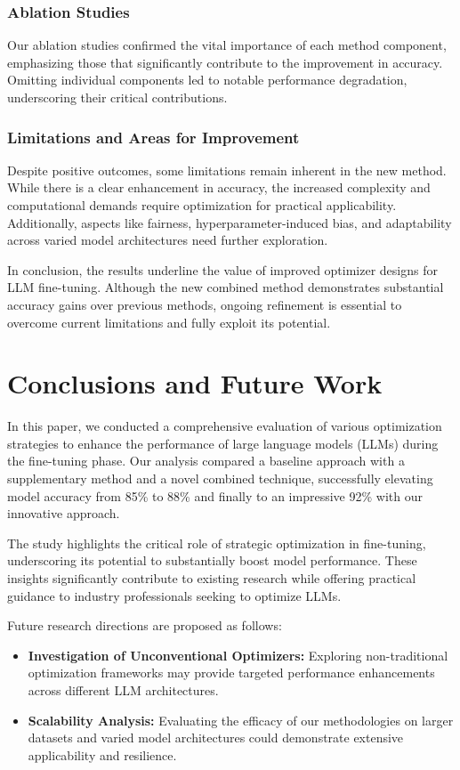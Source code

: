 \documentclass{article} %
\begin{document}
\subsubsection{Ablation Studies}
Our ablation studies confirmed the vital importance of each method component, emphasizing those that significantly contribute to the improvement in accuracy. Omitting individual components led to notable performance degradation, underscoring their critical contributions.

\subsubsection{Limitations and Areas for Improvement}
Despite positive outcomes, some limitations remain inherent in the new method. While there is a clear enhancement in accuracy, the increased complexity and computational demands require optimization for practical applicability. Additionally, aspects like fairness, hyperparameter-induced bias, and adaptability across varied model architectures need further exploration.

In conclusion, the results underline the value of improved optimizer designs for LLM fine-tuning. Although the new combined method demonstrates substantial accuracy gains over previous methods, ongoing refinement is essential to overcome current limitations and fully exploit its potential.

\section{Conclusions and Future Work}
\label{sec:conclusion}
In this paper, we conducted a comprehensive evaluation of various optimization strategies to enhance the performance of large language models (LLMs) during the fine-tuning phase. Our analysis compared a baseline approach with a supplementary method and a novel combined technique, successfully elevating model accuracy from 85\% to 88\% and finally to an impressive 92\% with our innovative approach.

The study highlights the critical role of strategic optimization in fine-tuning, underscoring its potential to substantially boost model performance. These insights significantly contribute to existing research while offering practical guidance to industry professionals seeking to optimize LLMs.

Future research directions are proposed as follows:
\begin{itemize}
\item \textbf{Investigation of Unconventional Optimizers:} Exploring non-traditional optimization frameworks may provide targeted performance enhancements across different LLM architectures.
\item \textbf{Scalability Analysis:} Evaluating the efficacy of our methodologies on larger datasets and varied model architectures could demonstrate extensive applicability and resilience.
\end{itemize}
\end{document}
